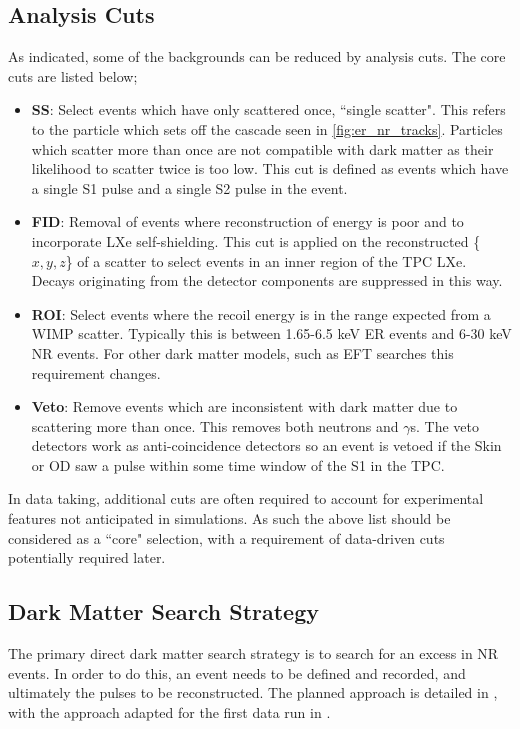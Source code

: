 \subsection{Analysis Cuts}
\par
As indicated, some of the backgrounds can be reduced by analysis cuts. 
The core cuts are listed below;
\begin{itemize}
    \item \textbf{SS}: Select events which have only scattered once, ``single scatter". This refers to the particle which sets off the cascade seen in \autoref{fig:er_nr_tracks}. Particles which scatter more than once are not compatible with dark matter as their likelihood to scatter twice is too low. This cut is defined as events which have a single S1 pulse and a single S2 pulse in the event.
    \item \textbf{FID}: Removal of events where reconstruction of energy is poor and to incorporate LXe self-shielding. This cut is applied on the reconstructed \{$x,y,z$\} of a scatter to select events in an inner region of the TPC LXe. Decays originating from the detector components are suppressed in this way.
    \item \textbf{ROI}: Select events where the recoil energy is in the range expected from a WIMP scatter. Typically this is between 1.65-6.5 keV ER events and 6-30 keV NR events. For other dark matter models, such as EFT searches this requirement changes.%
    \item \textbf{Veto}: Remove events which are inconsistent with dark matter due to scattering more than once. This removes both neutrons and $\gamma$s. The veto detectors work as anti-coincidence detectors so an event is vetoed if the Skin or OD saw a pulse within some time window of the S1 in the TPC.
\end{itemize}
In data taking, additional cuts are often required to account for experimental features not anticipated in simulations.
As such the above list should be considered as a ``core" selection, with a requirement of data-driven cuts potentially required later.

\subsection{Dark Matter Search Strategy}
\par
The primary direct dark matter search strategy is to search for an excess in NR events.
In order to do this, an event needs to be defined and recorded, and ultimately the pulses to be reconstructed.
The planned approach is detailed in \cite{LZ_TechnicalDesignReview_ref}, with the approach adapted for the first data run in \cite{lz_ws_sr1_ref}.

